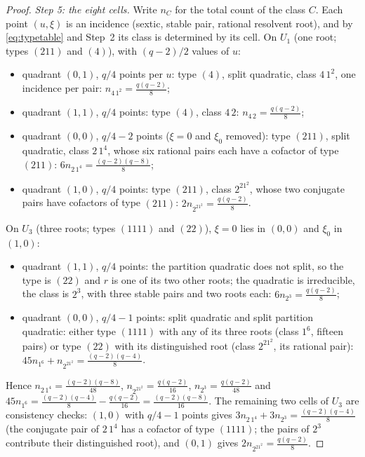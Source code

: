 \documentclass[12pt,a4paper]{amsart}
\theoremstyle{definition}
\begin{document}
\begin{proof}
\emph{Step 5: the eight cells.} Write $n_C$ for the total count of the class $C$. Each point $(u,\xi)$ is an incidence (sextic, stable pair, rational resolvent root), and by \eqref{eq:typetable} and Step~2 its class is determined by its cell. On $U_1$ (one root; types $(211)$ and $(4)$), with $(q-2)/2$ values of $u$:
\begin{itemize}[leftmargin=2em]
\item quadrant $(0,1)$, $q/4$ points per $u$: type $(4)$, split quadratic, class $4\,1^2$, one incidence per pair: $n_{4\,1^2}=\frac{q(q-2)}8$;
\item quadrant $(1,1)$, $q/4$ points: type $(4)$, class $4\,2$: $n_{4\,2}=\frac{q(q-2)}8$;
\item quadrant $(0,0)$, $q/4-2$ points ($\xi=0$ and $\xi_0$ removed): type $(211)$, split quadratic, class $2\,1^4$, whose six rational pairs each have a cofactor of type $(211)$: $6n_{2\,1^4}=\frac{(q-2)(q-8)}8$;
\item quadrant $(1,0)$, $q/4$ points: type $(211)$, class $2^21^2$, whose two conjugate pairs have cofactors of type $(211)$: $2n_{2^21^2}=\frac{q(q-2)}8$.
\end{itemize}
On $U_3$ (three roots; types $(1111)$ and $(22)$), $\xi=0$ lies in $(0,0)$ and $\xi_0$ in $(1,0)$:
\begin{itemize}[leftmargin=2em]
\item quadrant $(1,1)$, $q/4$ points: the partition quadratic does not split, so the type is $(22)$ and $r$ is one of its two other roots; the quadratic is irreducible, the class is $2^3$, with three stable pairs and two roots each: $6n_{2^3}=\frac{q(q-2)}8$;
\item quadrant $(0,0)$, $q/4-1$ points: split quadratic and split partition quadratic: either type $(1111)$ with any of its three roots (class $1^6$, fifteen pairs) or type $(22)$ with its distinguished root (class $2^21^2$, its rational pair): $45n_{1^6}+n_{2^21^2}=\frac{(q-2)(q-4)}8$.
\end{itemize}
Hence $n_{2\,1^4}=\frac{(q-2)(q-8)}{48}$, $n_{2^21^2}=\frac{q(q-2)}{16}$, $n_{2^3}=\frac{q(q-2)}{48}$ and $45n_{1^6}=\frac{(q-2)(q-4)}8-\frac{q(q-2)}{16}=\frac{(q-2)(q-8)}{16}$. The remaining two cells of $U_3$ are consistency checks: $(1,0)$ with $q/4-1$ points gives $3n_{2\,1^4}+3n_{2^3}=\frac{(q-2)(q-4)}8$ (the conjugate pair of $2\,1^4$ has a cofactor of type $(1111)$; the pairs of $2^3$ contribute their distinguished root), and $(0,1)$ gives $2n_{2^21^2}=\frac{q(q-2)}8$.


\end{proof}
\end{document}
